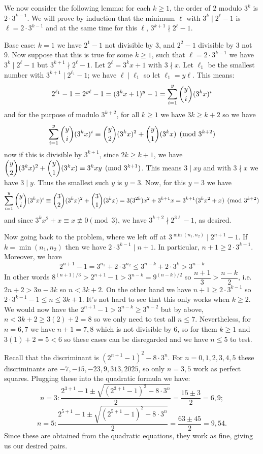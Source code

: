\documentclass[11pt]{article}
\newcommand{\<}{\langle}
\renewcommand{\>}{\rangle}
\begin{document}
\begin{enumerate}
	We now consider the following lemma: for each $k\ge 1$, the order of $2$ modulo $3^k$ is $2\cdot 3^{k-1}$. We will prove by induction that the minimum $\ell$ with $3^k\mid 2^{\ell}-1$ is $\ell=2\cdot 3^{k-1}$ and at the same time for this $\ell$, $3^{k+1}\nmid 2^{\ell}-1$. 
	
	Base case: $k=1$ we have $2^1-1$ not divisible by 3, and $2^2-1$ divisible by 3 not 9. Now suppose that this is true for some $k\ge 1$, such that $\ell=2\cdot 3^{k-1}$ we have $3^k\mid 2^{\ell}-1$ but $3^{k+1}\nmid 2^{\ell}-1$. Let $2^{\ell}=3^kx+1$ with $3\nmid x$. Let $\ell_1$ be the smallest number with $3^{k+1}\mid 2^{\ell_1}-1$; we have $\ell\mid \ell_1$ so let $\ell_1=y\ell$. This means: 
	\[
	2^{\ell_1}-1 = 2^{y\ell}-1=(3^kx+1)^y-1 = \displaystyle\sum_{i=1}^y \dbinom{y}{i}(3^kx)^i
	\]
	and for the purpose of modulo $3^{k+2}$, for all $k\ge 1$ we have $3k\ge k+2$ so we have 
	\[
	\displaystyle\sum_{i=1}^y \dbinom{y}{i}(3^kx)^i\equiv 
	\dbinom{y}{2}(3^kx)^2 + \dbinom{y}{1}(3^kx)
	\pmod{3^{k+2}}
	\]
	now if this is divisible by $3^{k+1}$, since $2k\ge k+1$, we have $\dbinom{y}{2}(3^kx)^2 + \dbinom{y}{1}(3^kx)\equiv 3^kxy\pmod{3^{k+1}}$. This means $3\mid xy$ and with $3\nmid x$ we have $3\mid y$. Thus the smallest such $y$ is $y=3$. Now, for this $y=3$ we have 
	\[
	\displaystyle\sum_{i=1}^y \dbinom{y}{i}(3^kx)^i\equiv 
	\dbinom{3}{2}(3^kx)^2 + \dbinom{3}{1}(3^kx)
	=3(3^{2k})x^2+3^{k+1}x
	=3^{k+1}(3^kx^2+x)
	\pmod{3^{k+2}}
	\]
	and since $3^kx^2+x\equiv x\not\equiv 0\pmod{3}$, we have $3^{k+2}\nmid 2^{3\ell}-1$, as desired. 
	
	Now going back to the problem, where we left off at $3^{\min(n_1, n_2)}\mid 2^{n+1}-1$. If $k=\min(n_1, n_2)$ then we have $2\cdot 3^{k-1}\mid n+1$. In particular, $n+1\ge 2\cdot 3^{k-1}$.  Moreover, we have 
	\[2^{n+1}-1= 3^{n_1}+2\cdot 3^{n_2}\le 3^{n-k}+2\cdot 3^k > 3^{n-k}
	\]
	In other words $8^{(n+1)/3}>2^{n+1}-1 > 3^{n-k}=9^{(n-k)/2}$ so $\dfrac{n+1}{3}> \dfrac{n-k}{2}$, i.e. $2n+2> 3n-3k$ so $n<3k+2$. On the other hand we have $n+1\ge 2\cdot 3^{k-1}$ so $2\cdot 3^{k-1} -1 \le n\le 3k+1$. It's not hard to see that this only works when $k\ge 2$. We would now have the $2^{n+1}-1>3^{n-k}\ge 3^{n-2}$ but by above, $n<3k+2\ge 3(2)+2=8$ so we only need to test all $n\le 7$. Nevertheless, for $n=6, 7$ we have $n+1=7, 8$ which is not divisible by 6, so for them $k\ge 1$ and $3(1)+2=5<6$ so these cases can be disregarded and we have $n\le 5$ to test. 
	
	Recall that the discriminant is $(2^{n+1}-1)^2-8\cdot 3^n$. For $n=0, 1, 2, 3, 4, 5$ these discriminants are $-7, -15, -23, 9, 313, 2025$, so only $n=3, 5$ work as perfect squares. Plugging these into the quadratic formula we have: 
	\[
	n=3: \dfrac{2^{3+1}-1 \pm \sqrt{(2^{3+1}-1)^2 - 8\cdot 3^n}}{2} = \dfrac{15\pm 3}{2}=6, 9;\]\[
	n = 5: \dfrac{2^{5+1}-1 \pm \sqrt{(2^{5+1}-1)^2 - 8\cdot 3^n}}{2} = \dfrac{63\pm 45}{2} = 9, 54. 
	\]
	Since these are obtained from the quadratic equations, they work as fine, giving us our desired pairs. 
	

\end{enumerate}
\end{document}
